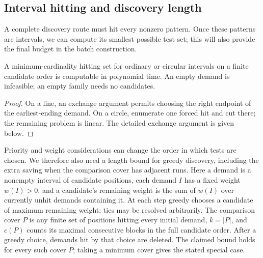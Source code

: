 \subsection{Interval hitting and discovery length}

A complete discovery route must hit every nonzero pattern. Once these
patterns are intervals, we can compute its smallest possible test set;
this will also provide the final budget in the batch construction.

\begin{lemma}\label{lem:minimum-interval-cover}
A minimum-cardinality hitting set for ordinary or circular intervals
on a finite candidate order is computable in polynomial time.
An empty demand is infeasible; an empty family needs no candidates.
\end{lemma}
\begin{proof}
On a line, an exchange argument permits choosing the right endpoint
of the earliest-ending demand. On a circle, enumerate one forced
hit and cut there; the remaining problem is linear. The detailed
exchange argument is given below.
\end{proof}

Priority and weight considerations can change the order in which tests
are chosen. We therefore also need a length bound for greedy discovery,
including the extra saving when the comparison cover has adjacent runs.
Here a demand is a nonempty interval of candidate positions, each demand
$I$ has a fixed weight $w(I)>0$, and a candidate's remaining weight is
the sum of $w(I)$ over currently unhit demands containing it. At each
step greedy chooses a candidate of maximum remaining weight; ties may
be resolved arbitrarily. The comparison cover $P$ is any finite set of
positions hitting every initial demand, $k=|P|$, and $c(P)$ counts its
maximal consecutive blocks in the full candidate order. After a greedy
choice, demands hit by that choice are deleted. The claimed bound holds
for every such cover $P$; taking a minimum cover gives the stated
special case.

